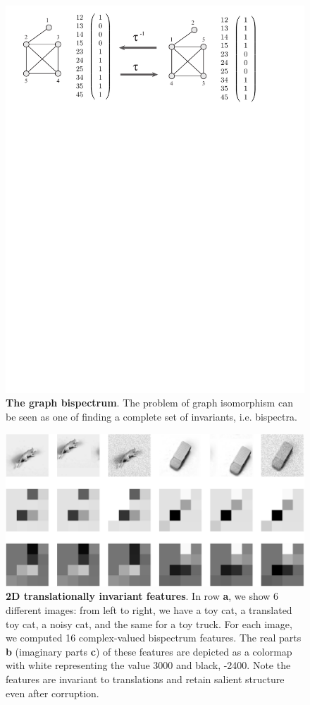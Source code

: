\documentclass[letterpaper, 10pt]{article}
\theoremstyle{definition}
\begin{document}
\begin{figure}
\begin{center}
   \includegraphics[width=.85 \linewidth]{figs/binary_graph.pdf} 
\caption{\textbf{The graph bispectrum}. The problem of graph isomorphism can be seen as one of finding a complete set of invariants, i.e. bispectra.}
\label{bispetrum_graphs}
\end{center}
\end{figure}


\begin{figure}
\begin{center}
   \includegraphics[width=.9 \linewidth]{figs/bispect_examples_2.png} 
\caption{\textbf{2D translationally invariant features}. In row \textbf{a}, we show 6 different images:  from left to right, we have a toy cat, a translated toy cat, a noisy cat, and the same for a toy truck.  For each image, we computed 16 complex-valued bispectrum features. The real parts \textbf{b} (imaginary parts \textbf{c}) of these features are depicted as a colormap with white representing the value 3000 and black, -2400.  Note the features are invariant to translations and retain salient structure even after corruption.}
\label{bispetrum_intuition2}
\end{center}
\end{figure}
\end{document}
